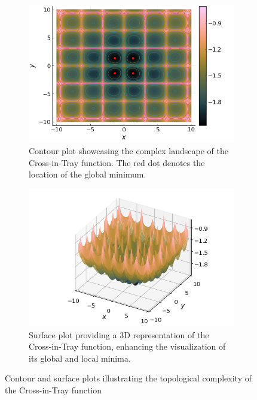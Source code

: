   \begin{figure}[ht!]
    \centering
    \begin{subfigure}[b]{0.45\textwidth}
      \centering
      \includegraphics[width=\textwidth]
        {img/test_functions/cross_in_tray_contour.png}
      \caption{
        Contour plot showcasing the complex landscape of the Cross-in-Tray 
        function. 
        The red dot denotes the location of the global minimum.
      }
      \label{fig:app:test:cross-in-tray:contour}
    \end{subfigure}
    \hfill
    \begin{subfigure}[b]{0.45\textwidth}
      \centering
      \includegraphics[width=\textwidth]
        {img/test_functions/cross_in_tray_surface.png}
      \caption{
        Surface plot providing a 3D representation of the Cross-in-Tray 
        function, enhancing the visualization of its global and local minima.
      }
      \label{fig:app:test:cross-in-tray:surface}
    \end{subfigure}
    \caption{
      Contour and surface plots illustrating the topological complexity of the 
      Cross-in-Tray function
    }
    \label{fig:app:test:cross-in-tray}
  \end{figure}
